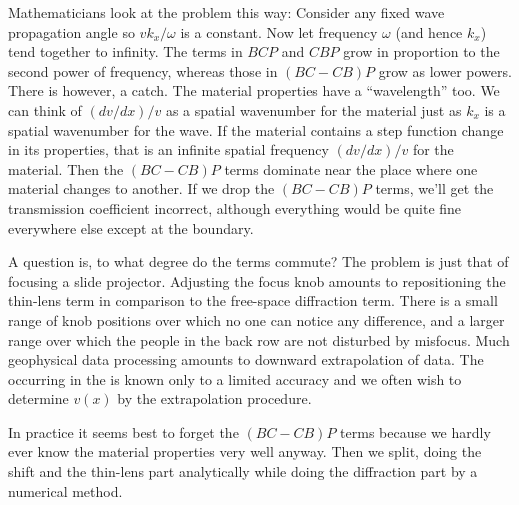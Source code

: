 
\par
Mathematicians look at the problem this way:
Consider any fixed wave propagation angle
so $vk_x/\omega$ is a constant.
Now let frequency $\omega$ (and hence $k_x$) tend together to infinity.
The terms in $BCP$ and $CBP$ grow in proportion to the second power
of frequency,
whereas those in $(BC-CB)P$ grow as lower powers.
There is however, a catch.
The material properties have a ``wavelength'' too.
We can think of $(dv/dx)/v$ as a spatial wavenumber
for the material just as $k_x$ is a spatial wavenumber for the wave.
If the material contains a step function change in its properties,
that is an infinite spatial frequency $(dv/dx)/v$ for the material.
Then the $(BC-CB)P$ terms dominate near the place where
one material changes to another.
If we drop the $(BC-CB)P$ terms,
we'll get the transmission coefficient incorrect,
although everything would be quite fine everywhere else
except at the boundary.

\par
A question is,
to what degree do the terms commute?
The problem is just that of
focusing a slide projector.
Adjusting the focus knob amounts to
repositioning the thin-lens term
in comparison to the free-space diffraction term.
There is a small range of knob positions over
which no one can notice any difference,
and a larger range over which
the people in the back row are not disturbed by misfocus.
Much geophysical data processing amounts to downward extrapolation of data.
The
occurring in the 
is known only to a limited accuracy
and we often wish to determine  $v(x)$
by the extrapolation procedure.

\par
In practice it seems best to
forget the  $(BC-CB)P$ terms because we hardly ever know
the material properties very well anyway.
Then we split,
doing the shift and the thin-lens part analytically
while doing the diffraction part by a numerical method.



